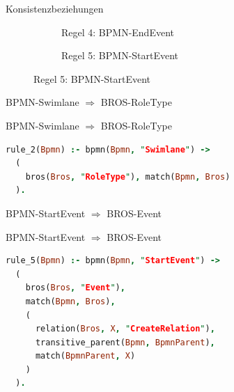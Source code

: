 \begin{frame}{Konsistenzbeziehungen}
\begin{figure}
\begin{subfigure}{0.3\textwidth}
\begin{adjustbox}{width=0.8\linewidth,center}
        \end{adjustbox}
        \caption*{\tiny{\textcolor{black!20}{Regel 4: BPMN-EndEvent}}}%
    \end{subfigure}
    \hspace{16pt}
    \begin{subfigure}{0.3\textwidth}
        \vspace{4pt}
        \centering
        \begin{adjustbox}{width=0.8\linewidth,center}
        \end{adjustbox}
        \caption*{\tiny{Regel 5: BPMN-StartEvent}}%
    \end{subfigure}
  \end{figure}
\end{frame}

\begin{frame}{BPMN-Swimlane $\Rightarrow$ BROS-RoleType}
  \begin{figure}
    \centering
    \begin{adjustbox}{width=0.5\linewidth,center}
      
    \end{adjustbox}
  \end{figure}
\end{frame}
\begin{frame}[fragile]{BPMN-Swimlane $\Rightarrow$ BROS-RoleType}
\begin{lstlisting}[language=Prolog]
rule_2(Bpmn) :- bpmn(Bpmn, "Swimlane") ->
  (
    bros(Bros, "RoleType"), match(Bpmn, Bros)
  ).
\end{lstlisting}
\end{frame}
\begin{frame}{BPMN-StartEvent $\Rightarrow$ BROS-Event}
  \begin{figure}
    \centering
    \begin{adjustbox}{width=0.5\linewidth,center}
      
    \end{adjustbox}
  \end{figure}
\end{frame}
\begin{frame}[fragile]{BPMN-StartEvent $\Rightarrow$ BROS-Event}
\begin{lstlisting}[language=Prolog]
rule_5(Bpmn) :- bpmn(Bpmn, "StartEvent") ->
  (
    bros(Bros, "Event"),
    match(Bpmn, Bros),
    (
      relation(Bros, X, "CreateRelation"),
      transitive_parent(Bpmn, BpmnParent),
      match(BpmnParent, X)
    )
  ).
\end{lstlisting}
\end{frame}